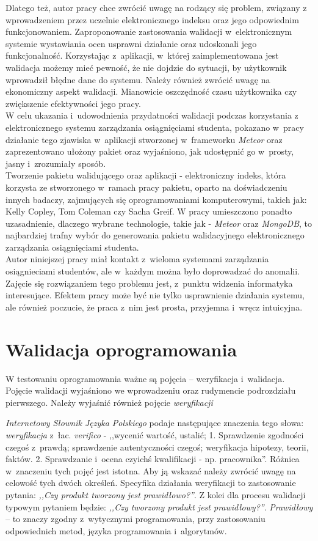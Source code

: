 \documentclass{xmgr}
\begin{document}
Dlatego też, autor pracy chce zwrócić uwagę na rodzący się problem, związany
z wprowadzeniem przez uczelnie elektronicznego indeksu oraz jego odpowiednim
funkcjonowaniem. Zaproponowanie zastosowania walidacji w~elektronicznym systemie
wystawiania ocen usprawni działanie oraz udoskonali jego funkcjonalność.
Korzystając z~aplikacji, w~której zaimplementowana jest walidacja możemy mieć pewność,
że nie dojdzie do sytuacji, by użytkownik wprowadził błędne dane do systemu.
Należy również zwrócić uwagę na ekonomiczny aspekt walidacji. Mianowicie oszczędność
czasu użytkownika czy zwiększenie efektywności jego pracy.
\\
\indent W celu ukazania i~udowodnienia przydatności walidacji podczas korzystania
z elektronicznego systemu zarządzania osiągnięciami studenta, pokazano w~pracy
działanie tego zjawiska w~aplikacji stworzonej w~frameworku \textit{Meteor} oraz
zaprezentowano ułożony pakiet oraz wyjaśniono, jak udostępnić go w~prosty, jasny i~zrozumiały sposób.
\\
\indent Tworzenie pakietu walidującego oraz aplikacji - elektroniczny indeks, która korzysta
ze stworzonego w~ramach pracy pakietu, oparto na doświadczeniu innych badaczy,
zajmujących się oprogramowaniami komputerowymi, takich jak: Kelly Copley, Tom
Coleman czy Sacha Greif. W pracy umieszczono ponadto uzasadnienie, dlaczego wybrane
technologie, takie jak - \textit{Meteor} oraz \textit{MongoDB}, to najbardziej trafny wybór do generowania
pakietu walidacyjnego elektronicznego zarządzania osiągnięciami studenta.
\\
\indent Autor niniejszej pracy miał kontakt z~wieloma systemami zarządzania osiągnieciami
studentów, ale w~każdym można było doprowadzać do anomalii. Zajęcie się rozwiązaniem
tego problemu jest, z~punktu widzenia informatyka interesujące. Efektem pracy może być
nie tylko usprawnienie działania systemu, ale również poczucie, że praca z~nim jest
prosta, przyjemna i~wręcz intuicyjna.

\chapter{Walidacja oprogramowania}

\indent \indent \indent W testowaniu oprogramowania ważne są pojęcia – weryfikacja i~walidacja. Pojęcie walidacji wyjaśniono we wprowadzeniu oraz rudymencie podrozdziału pierwszego. Należy wyjaśnić również pojęcie \textit{weryfikacji}

\textit{Internetowy Słownik Języka Polskiego} podaje następujące znaczenia tego słowa: \textit{weryfikacja} z~łac. \textit{verifico} - ,,wycenić wartość, ustalić; 1. Sprawdzenie zgodności czegoś z~prawdą; sprawdzenie autentyczności czegoś; weryfikacja hipotezy, teorii, faktów. 2. Sprawdzanie i~ocena czyichś kwalifikacji - np. pracownika''. Różnica w~znaczeniu tych pojęć jest istotna. Aby ją wskazać należy zwrócić uwagę na celowość tych dwóch określeń. Specyfika działania weryfikacji to zastosowanie pytania: \textit{,,Czy produkt tworzony jest prawidłowo?''}. Z kolei dla procesu walidacji typowym pytaniem będzie: \textit{,,Czy tworzony produkt jest prawidłowy?''}. \textit{Prawidłowy} – to znaczy zgodny z~wytycznymi programowania, przy zastosowaniu odpowiednich metod, języka programowania i~algorytmów. 
\end{document}
